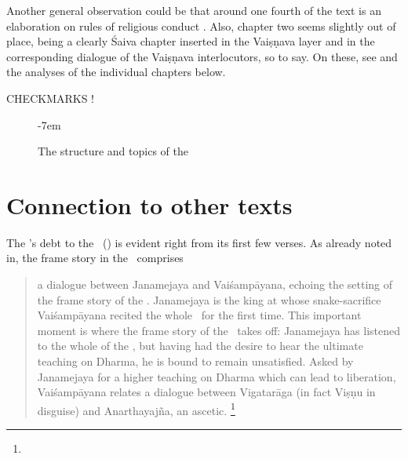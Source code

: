 Another general observation
could be that around one fourth of the text is
an elaboration on rules of religious conduct 
. Also, chapter two seems slightly
out of place, being a clearly Śaiva chapter inserted
in the Vaiṣṇava layer and in the corresponding 
dialogue of the Vai\-ṣṇa\-va interlocutors, so to say.
On these, see 
and the analyses of the individual chapters below.

CHECKMARKS !



\begin{figure}[!]

\begin{center}
\thispagestyle{empty}
\vspace{0em}
\leftskip-7em
\end{center}

\caption[Structure and topics of the \VSS]{The structure and topics of the \VSS\ 
   \label{fig:structlotus}}
   
\end{figure}



\section{Connection to other texts}
\label{vss_connection_other_texts}

The \VSS's debt to the \MBh\ (\MBH) is evident right
from its first few verses. As already noted in, 
the frame story in the \VSS\  comprises

\begin{quote}
a dialogue between Janamejaya and Vaiśampāyana, 
echoing the setting of the frame story of the \MBh. 
Janamejaya is the king at whose snake-sacrifice 
Vaiśampāyana recited the whole \MBh\ for the first
time. This important moment is where the frame story 
of the \Vss\ takes off: Janamejaya has 
listened to the whole of the \MBh,
but having had the desire to hear the ultimate 
teaching on Dharma, he is bound to remain unsatisfied.
 Asked by Janamejaya for a higher teaching
on Dharma which can lead to liberation, 
Vaiśampāyana relates a dialogue between Vigatarāga 
(in fact Viṣṇu in disguise) and Anarthayajña, an ascet­ic.%
				\footnote{}
\end{quote}
 
